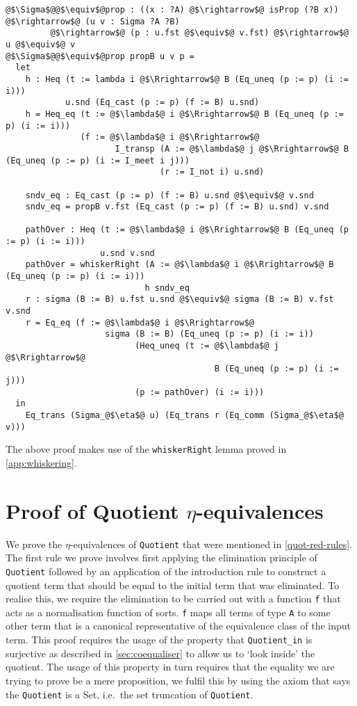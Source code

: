 \documentclass[12pt,twoside,maitrise]{dms}
\theoremstyle{definition}
\numberwithin{equation}{section}
\numberwithin{table}{chapter}
\numberwithin{figure}{chapter}
\newcommand\id[1] {\texttt{#1}}
\begin{document}
\begin{verbatim}
@$\Sigma$@@$\equiv$@prop : ((x : ?A) @$\rightarrow$@ isProp (?B x)) @$\rightarrow$@ (u v : Sigma ?A ?B)
         @$\rightarrow$@ (p : u.fst @$\equiv$@ v.fst) @$\rightarrow$@ u @$\equiv$@ v
@$\Sigma$@@$\equiv$@prop propB u v p =
  let
    h : Heq (t := lambda i @$\Rrightarrow$@ B (Eq_uneq (p := p) (i := i)))
            u.snd (Eq_cast (p := p) (f := B) u.snd)
    h = Heq_eq (t := @$\lambda$@ i @$\Rrightarrow$@ B (Eq_uneq (p := p) (i := i)))
               (f := @$\lambda$@ i @$\Rrightarrow$@
                      I_transp (A := @$\lambda$@ j @$\Rrightarrow$@ B (Eq_uneq (p := p) (i := I_meet i j)))
                               (r := I_not i) u.snd)

    sndv_eq : Eq_cast (p := p) (f := B) u.snd @$\equiv$@ v.snd
    sndv_eq = propB v.fst (Eq_cast (p := p) (f := B) u.snd) v.snd

    pathOver : Heq (t := @$\lambda$@ i @$\Rrightarrow$@ B (Eq_uneq (p := p) (i := i)))
                   u.snd v.snd
    pathOver = whiskerRight (A := @$\lambda$@ i @$\Rrightarrow$@ B (Eq_uneq (p := p) (i := i)))
                            h sndv_eq
    r : sigma (B := B) u.fst u.snd @$\equiv$@ sigma (B := B) v.fst v.snd
    r = Eq_eq (f := @$\lambda$@ i @$\Rrightarrow$@
                    sigma (B := B) (Eq_uneq (p := p) (i := i))
                          (Heq_uneq (t := @$\lambda$@ j @$\Rrightarrow$@
                                          B (Eq_uneq (p := p) (i := j)))
                          (p := pathOver) (i := i)))
  in
    Eq_trans (Sigma_@$\eta$@ u) (Eq_trans r (Eq_comm (Sigma_@$\eta$@ v)))
\end{verbatim}

The above proof makes use of the \id{whiskerRight} lemma proved in
\autoref{app:whiskering}.

\section{Proof of Quotient $\eta$-equivalences}\label{app:quotient-eta}

We prove the $\eta$-equivalences of \id{Quotient} that were mentioned in
\autoref{quot-red-rules}. The first rule we prove involves first applying the
elimination principle of \id{Quotient} followed by an application of the
introduction rule to construct a quotient term that should be equal to the
initial term that was eliminated. To realise this, we require the elimination to
be carried out with a function \id{f} that acts as a normalisation function of
sorts. \id{f} maps all terms of type \id{A} to some other term that is a
canonical representative of the equivalence class of the input term. This proof
requires the usage of the property that \id{Quotient\_in} is surjective as
described in \autoref{sec:coequaliser} to allow us to `look inside' the
quotient. The usage of this property in turn requires that the equality we are
trying to prove be a mere proposition, we fulfil this by using the axiom that
says the \id{Quotient} is a Set, i.e.\ the set truncation of \id{Quotient}.
\end{document}
